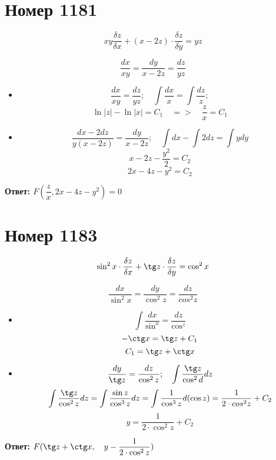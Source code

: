 \section*{Номер 1181}
$$ xy \dfrac{\delta z}{\delta x} + (x - 2z) \cdot \dfrac{\delta z}{\delta y} = yz $$

\begin{solution}

    $$ \dfrac{dx}{xy} = \dfrac{dy}{x - 2z} = \dfrac{dz}{yz} $$

    \begin{itemize}

        \item
              $$ \dfrac{dx}{xy} = \dfrac{dz}{yz};\quad \int \dfrac{dx}{x} = \int \dfrac{dz}{z}; $$
              $$ \ln |z| - \ln |x| = C_1\quad=>\quad\dfrac{z}{x} = C_1 $$
        \item
              $$ \dfrac{dx - 2dz}{y(x - 2z)} = \dfrac{dy}{x - 2z};\quad \int dx - \int 2dz = \int ydy $$
              $$ x - 2z - \dfrac{y^2}{2} = C_2 $$
              $$ 2x - 4z - y^2 = C_2 $$
    \end{itemize}

    \textbf{Ответ: $ F(\dfrac{z}{x}, 2x - 4z - y^2) = 0 $}

\end{solution}

\section*{Номер 1183}

$$ \sin^2x \cdot \dfrac{\delta z}{\delta x} + \tg z \cdot \dfrac{\delta z}{\delta y} = \cos^2x $$

\begin{solution}
    $$ \dfrac{dx}{\sin^2x} = \dfrac{dy}{\cos^2z} = \dfrac{dz}{cos^2z} $$

    \begin{itemize}
        \item
              $$  \int \dfrac{dx}{\sin^x} = \dfrac{dz}{\cos^z} $$
              $$ -\ctg x = \tg z + C_1 $$
              $$ C_1 = \tg z + \ctg x $$
        \item
              $$ \dfrac{dy}{\tg z} = \dfrac{dz}{\cos^2z};\quad \int \dfrac{\tg z}{\cos^2d}dz $$
              $$ \int \dfrac{\tg z}{\cos^2z} dz = \int \dfrac{\sin z}{\cos^3z} dz = \int \dfrac{1}{\cos^3z} d(\cos z) = \dfrac{1}{2 \cdot cos^2z} + C_2 $$
              $$ y = \dfrac{1}{2 \cdot \cos^2z} + C_2 $$
    \end{itemize}
    \textbf{Ответ: $ F(\tg z + \ctg x,\quad y - \dfrac{1}{2 \cdot \cos^2z}) $}
    
\end{solution}\pagebreak
